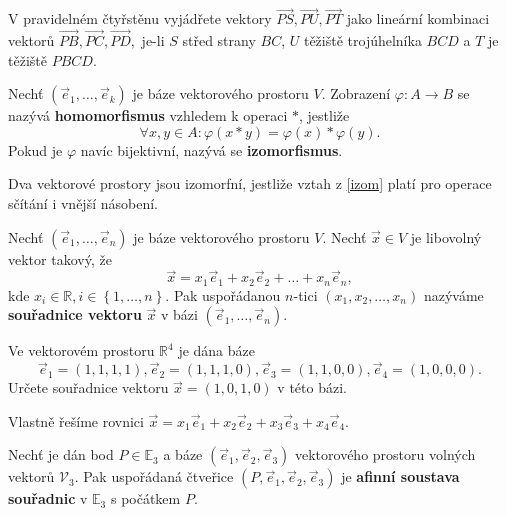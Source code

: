 \begin{priklad}V pravidelném čtyřstěnu vyjádřete vektory $\overrightarrow{PS},\overrightarrow{PU},\overrightarrow{PT}$ jako
lineární kombinaci vektorů $\overrightarrow{PB},\overrightarrow{PC},\overrightarrow{PD},$
je-li $S$ střed strany $BC$, $U$ těžiště trojúhelníka $BCD$ a $T$ je těžiště
$PBCD$.
\end{priklad}

\begin{definition}\label{izom}
    Nechť $(\vec e_1,\dots, \vec e_k)$ je báze vektorového prostoru $V$. Zobrazení
    $\varphi: A\to B$ se nazývá \textbf{homomorfismus} vzhledem k operaci $*$, jestliže
    $$\forall x,y \in A:\varphi(x*y)=\varphi(x)*\varphi(y).$$
    Pokud je $\varphi$ navíc bijektivní, nazývá se \textbf{izomorfismus}.
\end{definition}

\begin{pozn}
    Dva vektorové prostory jsou izomorfní, jestliže vztah z \ref{izom} platí pro
    operace sčítání i vnější násobení.
\end{pozn}

\begin{definition}
    Nechť $(\vec e_1, \dots, \vec e_n)$ je báze vektorového prostoru $V$. Nechť
    $\vec x \in V$ je libovolný vektor takový, že
    $$\vec x = x_1\vec e_1 + x_2\vec e_2 + \dots + x_n\vec e_n,$$
    kde $x_i \in \mathbb R, i\in \left \{ 1,\dots,n \right \} .$ Pak uspořádanou
    $n$-tici $(x_1, x_2,\dots,x_n)$ nazýváme \textbf{souřadnice vektoru} $\vec x$ v
    bázi $(\vec e_1, \dots, \vec e_n)$.
\end{definition}

\begin{priklad}
Ve vektorovém prostoru $\mathbb R^4$ je dána báze
\begin{equation*}
    \vec e_1=(1,1,1,1), \vec e_2 = (1,1,1,0), \vec e_3 = (1,1,0,0), \vec e_4 = (1,0,0,0).
\end{equation*}
Určete souřadnice vektoru $\vec x = (1,0,1,0)$ v této bázi.
\end{priklad}

\begin{reseni}
Vlastně řešíme rovnici $\vec x= x_1\vec e_1 + x_2\vec e_2 + x_3\vec e_3 + x_4\vec e_4.$
\end{reseni}

\begin{definition}
    Nechť je dán bod $P\in \mathbb E_3$ a báze $(\vec e_1, \vec e_2, \vec e_3)$ vektorového
    prostoru volných vektorů $\mathscr V_3$. Pak uspořádaná čtveřice
    $(P, \vec e_1, \vec e_2, \vec e_3)$ je
    \textbf{afinní soustava souřadnic} v $\mathbb E_3$ s počátkem $P$.
\end{definition}

